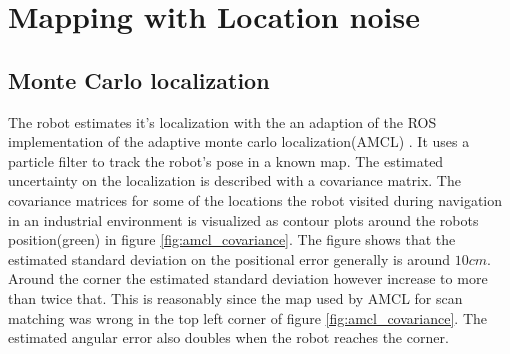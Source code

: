 \section{Mapping with Location noise}

\subsection{Monte Carlo localization}
The robot estimates it's localization with the an adaption of the ROS implementation \cite{ros_amcl} of the adaptive monte carlo localization(AMCL) \cite{Thrun200199}. It uses a particle filter to track the robot's pose in a known map. 
The estimated uncertainty on the localization is described with a covariance matrix. The covariance matrices for some of the locations the robot visited during navigation in an industrial environment is visualized as contour plots around the robots position(green) in figure \ref{fig:amcl_covariance}. 
The figure shows that the estimated standard deviation on the positional error generally is around $10cm$. Around the corner the estimated standard deviation however increase to more than twice that. This is reasonably since the map used by AMCL for scan matching was wrong in the top left corner of figure \ref{fig:amcl_covariance}. The estimated angular error also doubles when the robot reaches the corner.

